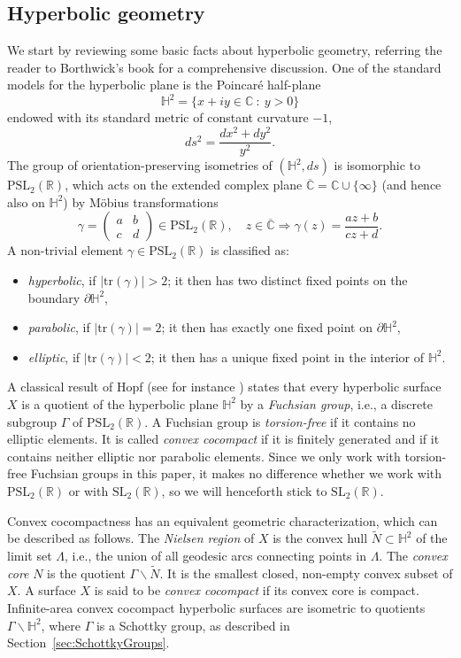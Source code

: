 \documentclass[12pt,letterpaper]{amsart}
\theoremstyle{plain}
\theoremstyle{definition}
\theoremstyle{remark}
\newcommand{\C}{\mathbb{C}}
\newcommand{\R}{\mathbb{R}}
\newcommand{\HH}{\mathbb{H}}
\newcommand{\pmat}[4]{\begin{pmatrix} #1&#2\\#3&#4\end{pmatrix}}
\begin{document}
\subsection{Hyperbolic geometry}\label{sec:hypGeom} We start by reviewing some basic facts about hyperbolic geometry, referring the reader to Borthwick's book \cite{Borthwick_book} for a comprehensive discussion. One of the standard models for the hyperbolic plane is the Poincar\'{e} half-plane
$$
\HH^2=\{ x+iy\in \C\ :\ y>0\} 
$$
endowed with its standard metric of constant curvature $-1$,
$$
ds^2=\frac{dx^2+dy^2}{y^2}.
$$ 
The group of orientation-preserving isometries of $(\HH^2, ds)$ is isomorphic to $\mathrm{PSL}_2(\R)$, which acts on the extended complex plane $\overline{\C} = \C \cup \{ \infty\}$ (and hence also on $\HH^2$) by M\"{o}bius transformations
$$
\gamma=\pmat{a}{b}{c}{d}\in \mathrm{PSL}_2(\R),\quad z\in\overline{\C} \Longrightarrow  \gamma(z) = \frac{az+b}{cz+d}.
$$
A non-trivial element \( \gamma \in \mathrm{PSL}_2(\mathbb{R}) \) is classified as:
\begin{itemize}
    \item \textit{hyperbolic}, if \( |\mathrm{tr}(\gamma)| > 2 \); it then has two distinct fixed points on the boundary \( \partial \HH^2 \),
    \item \textit{parabolic}, if \( |\mathrm{tr}(\gamma)| = 2 \); it then has exactly one fixed point on \( \partial \HH^2 \),
    \item \textit{elliptic}, if \( |\mathrm{tr}(\gamma)| < 2 \); it then has a unique fixed point in the interior of \( \HH^2 \).
\end{itemize}

A classical result of Hopf (see for instance \cite[Theorem 2.8]{Borthwick_book}) states that every  hyperbolic surface $X$ is a quotient of the hyperbolic plane $\HH^2$ by a \textit{Fuchsian group}, i.e., a discrete subgroup $\Gamma$ of $\mathrm{PSL}_2(\R)$. A Fuchsian group is \textit{torsion-free} if it contains no elliptic elements. It is called \textit{convex cocompact} if it is finitely generated and if it contains neither elliptic nor parabolic elements. Since we only work with torsion-free Fuchsian groups in this paper, it makes no difference whether we work with $\mathrm{PSL}_2(\R)$ or with $\mathrm{SL}_2(\R)$, so we will henceforth stick to $\mathrm{SL}_2(\R)$.

Convex cocompactness has an equivalent geometric characterization, which can be described as follows. The \textit{Nielsen region} of \( X \) is the convex hull \( \widetilde{N} \subset \HH^2 \) of the limit set \( \Lambda \), i.e., the union of all geodesic arcs connecting points in \( \Lambda \). The \textit{convex core} \( N \) is the quotient \( \Gamma \backslash \widetilde{N} \). It is the smallest closed, non-empty convex subset of \( X \). A surface \( X \) is said to be \textit{convex cocompact} if its convex core is compact. Infinite-area convex cocompact hyperbolic surfaces are isometric to quotients $\Gamma \backslash \HH^2$, where $\Gamma$ is a Schottky group, as described in Section~\ref{sec:SchottkyGroups}.
\end{document}
